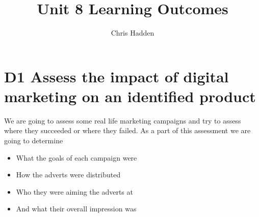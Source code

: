 \documentclass{article}
\title{Unit 8 Learning Outcomes}
\author{Chris Hadden}
\date{}
\begin{document}
\maketitle


\section{D1 Assess the impact of digital marketing on an identified product}

We are going to assess some real life marketing campaigns and try to assess where they succeeded or where they failed.
As a part of this assessment we are going to determine
\begin{itemize}
\item What the goals of each campaign were
\item How the adverts were distributed
\item Who they were aiming the adverts at
\item And what their overall impression was
\end{itemize}
\end{document}
